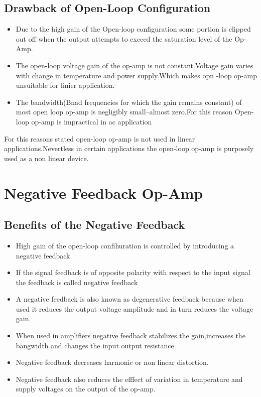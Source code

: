    \subsection{Drawback of Open-Loop Configuration}
   \begin{itemize}
   	\item Due to the high gain of the Open-loop configuration some portion is clipped out off when the output attempts to exceed the saturation level of the Op-Amp.
   	\item The open-loop voltage gain of the op-amp is not constant.Voltage gain varies with change in temperature and power supply.Which makes opn -loop op-amp unsuitable for linier application.
   	\item The bandwidth(Bnad frequencies for which the gain remains constant) of most open loop op-amp is negligibly small--almost zero.For this reason Open-loop op-amp is impractical in ac application
   \end{itemize}
   For this reasons stated open-loop op-amp is not used in linear applications.Nevertless in certain applications the open-loop op-amp is purposely used as a non linear device.\\
   \section{Negative Feedback Op-Amp}
   \subsection{Benefits of the Negative Feedback}
   \begin{itemize}
   	\item High gain of the open-loop confihuration is controlled by introducing a negative feedback.
   	\item If the signal feedback is of opposite polarity with respect to the input signal the feedback is called negative feedback
   	\item A negative feedback is also known as degenerative feedback because when used it reduces the output voltage amplitude and in turn reduces the voltage gain.
   	\item When used in amplifiers negative feedback stabilizes the gain,increases the bangwidth and changes the input output resistance.
   	\item Negative feedback decreases harmonic or non linear distortion.
   	\item Negative feedback also reduces the efffect of variation in temperature and supply voltages on the output of the op-amp.
   \end{itemize}
